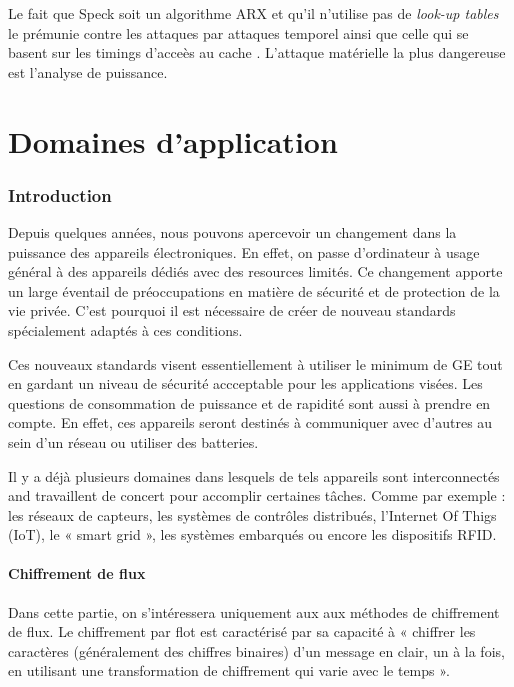 			Le fait que Speck soit un algorithme ARX
			et qu'il n'utilise pas de \textit{look-up tables} le prémunie contre
			les attaques par attaques temporel ainsi que celle qui se basent sur les
			timings d'acceès au cache \cite{speck_design}. L'attaque matérielle
			la plus dangereuse est l'analyse de puissance.

\newpage
\part{Domaines d'application}

	\section{Introduction}


	Depuis quelques années, nous pouvons apercevoir un changement dans la puissance des appareils électroniques.
	En effet, on passe d'ordinateur à usage général à des appareils dédiés avec des resources limités.
	Ce changement apporte un large éventail de préoccupations en matière de sécurité et de protection de la vie privée.
	C'est pourquoi il est nécessaire de créer de nouveau standards spécialement adaptés à ces conditions.

	Ces nouveaux standards visent essentiellement à utiliser le minimum de GE tout en gardant un niveau de sécurité accceptable pour les applications visées.
	Les questions de consommation de puissance et de rapidité sont aussi à prendre en compte.
	En effet, ces appareils seront destinés à communiquer avec d'autres au sein d'un réseau ou utiliser des batteries.

	Il y a déjà plusieurs domaines dans lesquels de tels appareils sont interconnectés and travaillent de concert pour accomplir certaines tâches.
	Comme par exemple : les réseaux de capteurs, les systèmes de contrôles distribués, l'Internet Of Thigs (IoT), le « smart grid », les systèmes embarqués ou encore les dispositifs RFID.

	\subsection{Chiffrement de flux}

	Dans cette partie, on s'intéressera uniquement aux aux méthodes de chiffrement de flux.
	Le chiffrement par flot est caractérisé par sa capacité à « chiffrer les caractères (généralement des chiffres binaires) d'un message en clair, un à la fois,
	en utilisant une transformation de chiffrement qui varie avec le temps »\cite{appliedCrypto}.

